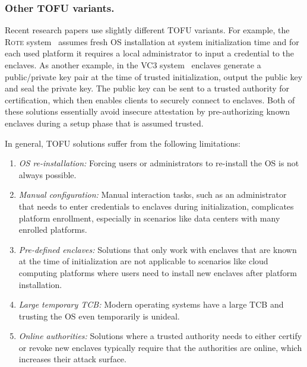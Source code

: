 \subsubsection{Other TOFU variants.}
Recent research papers use slightly different TOFU variants. For example, the \textsc{Rote} system~\cite{matetic2017rote} assumes fresh OS installation at system initialization time and for each used platform it requires a local administrator to input a credential to the enclaves. As another example, in the \textsc{VC3} system~\cite{schuster2015vc3} enclaves generate a public/private key pair at the time of trusted initialization, output the public key and seal the private key. The public key can be sent to a trusted authority for certification, which then enables clients to securely connect to enclaves. Both of these solutions essentially avoid insecure attestation by pre-authorizing known enclaves during a setup phase that is assumed trusted. 

In general, TOFU solutions suffer from the following limitations:

\begin{enumerate}
  \item \emph{OS re-installation:} Forcing users or administrators to re-install the OS is not always possible. 
  
  \item \emph{Manual configuration:} Manual interaction tasks, such as an administrator that needs to enter credentials to enclaves during initialization, complicates platform enrollment, especially in scenarios like data centers with many enrolled platforms.

  \item \emph{Pre-defined enclaves:} Solutions that only work with enclaves that are known at the time of initialization are not applicable to scenarios like cloud computing platforms where users need to install new enclaves after platform installation. 

  \item \emph{Large temporary TCB:} Modern operating systems have a large TCB and trusting the OS even temporarily is unideal.

  \item \emph{Online authorities:} Solutions where a trusted authority needs to either certify or revoke new enclaves typically require that the authorities are online, which increases their attack surface.
\end{enumerate}


